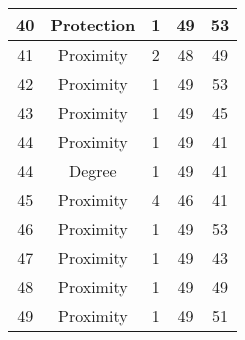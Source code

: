 \documentclass[results.tex]{subfiles}
\begin{document}
\begin{center}
\begin{tabular}{| c || c | c | c | c |}
            \hline
            40                      & Protection                   & 1                      & 49                      & 53                   \\
            \hline
            41                      & Proximity                    & 2                      & 48                      & 49                   \\
            \hline
            42                      & Proximity                    & 1                      & 49                      & 53                   \\
            \hline
            43                      & Proximity                    & 1                      & 49                      & 45                   \\
            \hline
            44                      & Proximity                    & 1                      & 49                      & 41                   \\
            \hline
            44                      & Degree                       & 1                      & 49                      & 41                   \\
            \hline
            45                      & Proximity                    & 4                      & 46                      & 41                   \\
            \hline
            46                      & Proximity                    & 1                      & 49                      & 53                   \\
            \hline
            47                      & Proximity                    & 1                      & 49                      & 43                   \\
            \hline
            48                      & Proximity                    & 1                      & 49                      & 49                   \\
            \hline
            49                      & Proximity                    & 1                      & 49                      & 51                   \\
            \hline
        \end{tabular}
    \end{center}
\end{document}
